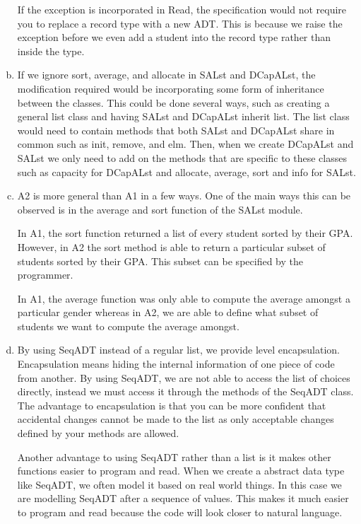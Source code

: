 \documentclass[12pt]{article}
\begin{document}
\begin{enumerate}[a)]
  If the exception is incorporated in Read, the specification would not require you to replace a record type with a new
  ADT. This is because we raise the exception before we even add a student into the record type rather than inside
  the type.

  \item If we ignore sort, average, and allocate in SALst and DCapALst, the modification required would be
  incorporating some form of inheritance between the classes.
  This could be done several ways, such as creating a general list class and having SALst and DCapALst inherit list.
  The list class would need to contain methods that both SALst and DCapALst share in common such as init, remove,
  and elm.
  Then, when we create DCapALst and SALst we only need to add on the methods that are specific to these classes such as
  capacity for DCapALst and allocate, average, sort and info for SALst.

  \item A2 is more general than A1 in a few ways.
  One of the main ways this can be observed is in the average and sort function of the SALst module.

  In A1, the sort function returned a list of every student sorted by their GPA.
  However, in A2 the sort method is able to return a particular subset of students sorted by their GPA.
  This subset can be specified by the programmer.

  In A1, the average function was only able to compute the average amongst a particular gender whereas in A2,
  we are able to define what subset of students we want to compute the average amongst.

  \item By using SeqADT instead of a regular list, we provide level encapsulation.
  Encapsulation means hiding the internal information of one piece of code from another.
  By using SeqADT, we are not able to access the list of choices directly, instead we must access it through the
  methods of the SeqADT class.
  The advantage to encapsulation is that you can be more confident that accidental changes cannot be made to the
  list as only acceptable changes defined by your methods are allowed.

    Another advantage to using SeqADT rather than a list is it makes other functions easier to program and read.
  When we create a abstract data type like SeqADT, we often model it based on real world things.
  In this case we are modelling SeqADT after a sequence of values.
  This makes it much easier to program and read because the code will look closer to natural language.


\end{enumerate}
\end{document}
